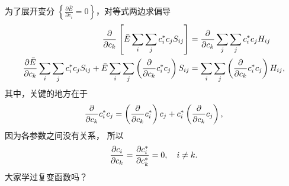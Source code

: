 为了展开变分 $\left\{\frac{\partial \bar E}{\partial c_i} = 0\right\}$，对等式两边求偏导
\begin{align}
    \pdv{c_k} \left[
        \bar E \sum_i \sum_j c_i^* c_j S_{ij}
        \right]
    &= \pdv{c_k} \sum_j \sum_j c_i^* c_j H_{ij} \notag\\
    \pdv{\bar E}{c_k} \sum_i \sum_j c_i^* c_j S_{ij} + 
    \bar E
    \sum_i \sum_j \left(\pdv{c_k}c_i^* c_j\right) S_{ij} &= 
    \sum_i \sum_j \left(\pdv{c_k}c_i^* c_j\right) H_{ij},
    \label{eq:perb_vari_dedci_1}
\end{align}
其中，关键的地方在于
\begin{align}
    \pdv{c_k} c_i^* c_j = \left(\pdv{c_k}c_i^*\right) c_j + c_i^* \left(\pdv{c_k} c_j\right),
\end{align}
因为各参数之间没有关系，
所以
\begin{align}
    \pdv{c_i}{c_k} = \pdv{c_i^*}{c_k^*} = 0, \quad i\neq k. 
\end{align}
大家学过复变函数吗？
